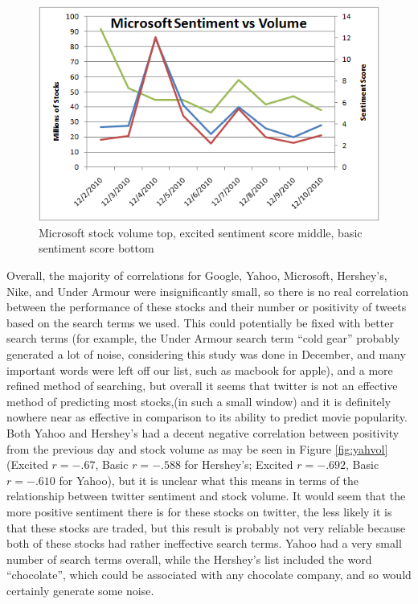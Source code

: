 \documentclass[11pt]{article}
\begin{document}
\begin{figure}[ht!]
\centering
\includegraphics[scale=.55]{img/micvol.png} 
\caption{Microsoft stock volume top, excited sentiment score middle, basic sentiment score bottom }
\label{fig:micvol}
\end{figure}

Overall, the majority of correlations for Google, Yahoo, Microsoft, Hershey’s, Nike, and Under Armour were insignificantly small, so there is no real correlation between the performance of these stocks and their number or positivity of tweets based on the search terms we used.  This could potentially be fixed with better search terms (for example, the Under Armour search term “cold gear” probably generated a lot of noise, considering this study was done in December, and many important words were left off our list, such as macbook for apple), and a more refined method of searching, but overall it seems that twitter is not an effective method of predicting most stocks,(in such a small window) and it is definitely nowhere near as effective in comparison to its ability to predict movie popularity.  Both Yahoo and Hershey’s had a decent negative correlation between positivity from the previous day and stock volume as may be seen in Figure \ref{fig:yahvol} (Excited $r=-.67$, Basic $r=-.588$ for Hershey’s; Excited $r= -.692$, Basic $r=-.610$ for Yahoo), but it is unclear what this means in terms of the relationship between twitter sentiment and stock volume.  It would seem that the more positive sentiment there is for these stocks on twitter, the less likely it is that these stocks are traded, but this result is probably not very reliable because both of these stocks had rather ineffective search terms.  Yahoo had a very small number of search terms overall, while the Hershey’s list included the word “chocolate”, which could be associated with any chocolate company, and so would certainly generate some noise.
\end{document}
